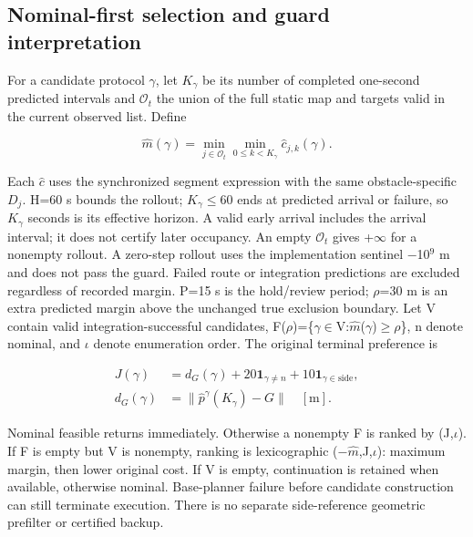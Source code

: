 \documentclass[conference]{IEEEtran}
\begin{document}
\subsection{Nominal-first selection and guard interpretation}

For a candidate protocol \ensuremath{\gamma}, let $K_\gamma$ be its number of completed one-second predicted intervals and $\mathcal O_t$ the union of the full static map and targets valid in the current observed list. Define

\begin{equation}\label{eq:3}
\hat m(\gamma)=\min_{j\in\mathcal O_t}\min_{0\le k<K_\gamma}\hat c_{j,k}(\gamma).
\end{equation}

Each $\hat c$ uses the synchronized segment expression with the same obstacle-specific $D_j$. H=60 s bounds the rollout; $K_\gamma$\ensuremath{\le}60 ends at predicted arrival or failure, so $K_\gamma$ seconds is its effective horizon. A valid early arrival includes the arrival interval; it does not certify later occupancy. An empty $\mathcal O_t$ gives +$\infty$ for a nonempty rollout. A zero-step rollout uses the implementation sentinel \ensuremath{-}10$^9$ m and does not pass the guard. Failed route or integration predictions are excluded regardless of recorded margin. P=15 s is the hold/review period; \ensuremath{\rho}=30 m is an extra predicted margin above the unchanged true exclusion boundary. Let V contain valid integration-successful candidates, F(\ensuremath{\rho})=\{\ensuremath{\gamma}\ensuremath{\in}V:$\hat m$(\ensuremath{\gamma})\ensuremath{\ge}\ensuremath{\rho}\}, n denote nominal, and \ensuremath{\iota} denote enumeration order. The original terminal preference is

\begin{equation}\label{eq:4}
\begin{aligned}J(\gamma)&=d_G(\gamma)+20\mathbf{1}_{\gamma\ne n}+10\mathbf{1}_{\gamma\in\mathrm{side}},\\d_G(\gamma)&=\|\hat p^\gamma(K_\gamma)-G\|\quad[\mathrm m].\end{aligned}
\end{equation}

Nominal feasible returns immediately. Otherwise a nonempty F is ranked by (J,\ensuremath{\iota}). If F is empty but V is nonempty, ranking is lexicographic (\ensuremath{-}$\hat m$,J,\ensuremath{\iota}): maximum margin, then lower original cost. If V is empty, continuation is retained when available, otherwise nominal. Base-planner failure before candidate construction can still terminate execution. There is no separate side-reference geometric prefilter or certified backup.
\end{document}

